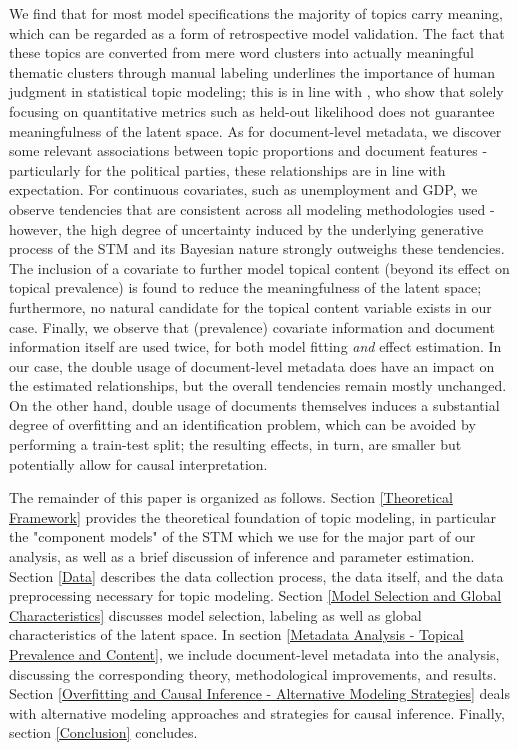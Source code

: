 We find that for most model specifications the majority of topics carry meaning, which can be regarded as a form of retrospective model validation. The fact that these topics are converted from mere word clusters into actually meaningful thematic clusters through manual labeling underlines the importance of human judgment in statistical topic modeling; this is in line with \cite{chang2009reading}, who show that solely focusing on quantitative metrics such as held-out likelihood does not guarantee meaningfulness of the latent space. As for document-level metadata, we discover some relevant associations between topic proportions and document features - particularly for the political parties, these relationships are in line with expectation. For continuous covariates, such as unemployment and GDP, we observe tendencies that are consistent across all modeling methodologies used - however, the high degree of uncertainty induced by the underlying generative process of the STM and its Bayesian nature strongly outweighs these tendencies. The inclusion of a covariate to further model topical content (beyond its effect on topical prevalence) is found to reduce the meaningfulness of the latent space; furthermore, no natural candidate for the topical content variable exists in our case. Finally, we observe that (prevalence) covariate information and document information itself are used twice, for both model fitting \textit{and} effect estimation. In our case, the double usage of document-level metadata does have an impact on the estimated relationships, but the overall tendencies remain mostly unchanged. On the other hand, double usage of documents themselves induces a substantial degree of overfitting and an identification problem, which can be avoided by performing a train-test split; the resulting effects, in turn, are smaller but potentially allow for causal interpretation.

The remainder of this paper is organized as follows. Section \ref{Theoretical Framework} provides the theoretical foundation of topic modeling, in particular the "component models" of the STM which we use for the major part of our analysis, as well as a brief discussion of inference and parameter estimation. Section \ref{Data} describes the data collection process, the data itself, and the data preprocessing necessary for topic modeling. Section \ref{Model Selection and Global Characteristics} discusses model selection, labeling as well as global characteristics of the latent space. In section \ref{Metadata Analysis - Topical Prevalence and Content}, we include document-level metadata into the analysis, discussing the corresponding theory, methodological improvements, and results. Section \ref{Overfitting and Causal Inference - Alternative Modeling Strategies} deals with alternative modeling approaches and strategies for causal inference. Finally, section \ref{Conclusion} concludes.
